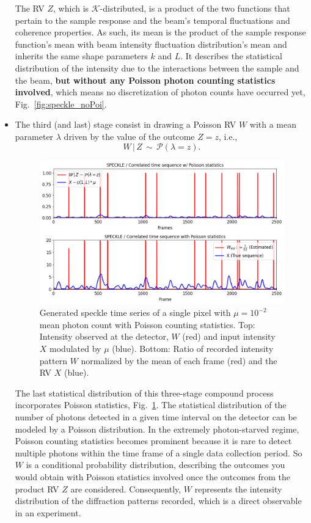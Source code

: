\documentclass[11pt]{article}
\theoremstyle{definition}
\begin{document}
\begin{itemize}
The RV \(Z\), which is \(\mathcal{K}\)-distributed, is a product of the two functions that pertain to the sample response and the beam's temporal fluctuations and coherence properties. As such, its mean is the product of the sample response function's mean with beam intensity fluctuation distribution's mean and inherits the same shape parameters $k$ and $L$. It describes the statistical distribution of the intensity due to the interactions between the sample and the beam, \textbf{but without any Poisson photon counting statistics involved}, which means no discretization of photon counts have occurred yet, Fig.~\ref{fig:speckle_noPoi}. 
%
\item The third (and last) stage consist in drawing a Poisson RV $W$ with a mean parameter $\lambda$ driven by the value of the outcome $Z=z$, i.e.,
%
\begin{equation}
W \,|\, Z   \, \sim \, \mathcal{P}(\lambda = z).  
\label{PDF_Z|Y}
\end{equation}
%
\begin{figure}[h!]
    \centering
    \includegraphics[width=120mm]{speckle_poi_newlegend.png}
    \caption{Generated speckle time series of a single pixel with \(\mu = 10^{-2}\) mean photon count with Poisson counting statistics. Top: Intensity observed at the detector, \(W\) (red) and input intensity \(X\) modulated by \(\mu\) (blue). Bottom: Ratio of recorded intensity pattern \(W\) normalized by the mean of each frame (red) and the RV \(X\) (blue).}
    \label{fig:speckle_Poi}
\end{figure}
The last statistical distribution of this three-stage compound process incorporates Poisson statistics, Fig.~\ref{fig:speckle_Poi}. The statistical distribution of the number of photons detected in a given time interval on the detector can be modeled by a Poisson distribution. In the extremely photon-starved regime, Poisson counting statistics becomes prominent because it is rare to detect multiple photons within the time frame of a single data collection period. 
So \(W\) is a conditional probability distribution, describing the outcomes you would obtain with Poisson statistics involved once the outcomes from the product RV \(Z\) are considered. Consequently, \(W\) represents the intensity distribution of the diffraction patterns recorded, which is a direct observable in an experiment. 
\end{itemize}
\end{document}
